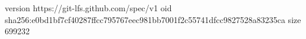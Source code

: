 version https://git-lfs.github.com/spec/v1
oid sha256:e0bd1bf7cf40287ffcc795767eec981bb7001f2c55741dfcc9827528a83235ca
size 699232
